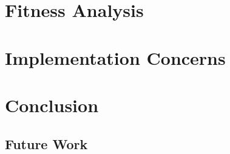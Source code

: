 \documentclass[conference]{IEEEtran}
\begin{document}
\section{Fitness Analysis}
\label{s-analysis}

\section{Implementation Concerns}
\label{s-implementation}

\section{Conclusion}
\label{s-conclusion}
\subsection{Future Work}
 


\end{document}
